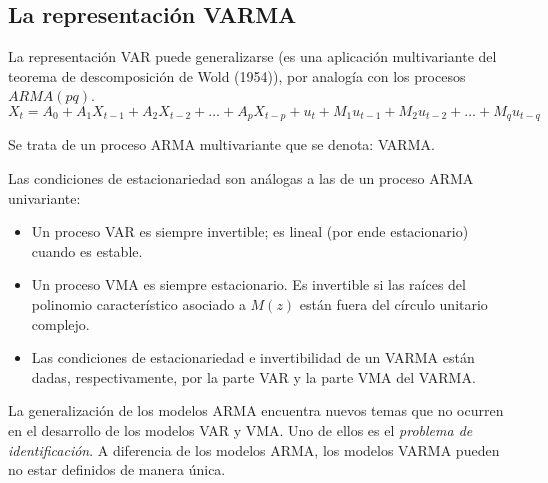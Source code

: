\subsection{La representaci\'{o}n VARMA}
\label{subsubsec:mylabel8}

La representaci\'{o}n VAR puede generalizarse (es una aplicaci\'{o}n multivariante del teorema de descomposici\'{o}n de Wold (1954)), por analog\'{i}a con los procesos $ARMA(pq)$.
\[
X_{t}=A_{0}+A_{1}X_{t-1}+A_{2}X_{t-2}+\ldots +A_{p}X_{t-p}+u_{t}+M_{1}u_{t-1}+M_{2}u_{t-2}+\ldots +M_{q}u_{t-q}
\]

Se trata de un proceso ARMA multivariante que se denota: VARMA.\newline

Las condiciones de estacionariedad son an\'{a}logas a las de un proceso ARMA univariante: 
\begin{itemize}
      \item Un proceso VAR es siempre invertible; es lineal (por ende estacionario) cuando es estable.
      \item Un proceso VMA es siempre estacionario. Es invertible si las ra\'{i}ces del polinomio caracter\'{i}stico asociado a $M(z)$ est\'{a}n fuera del c\'{i}rculo unitario complejo.
      \item Las condiciones de estacionariedad e invertibilidad de un VARMA est\'{a}n dadas, respectivamente, por la parte VAR y la parte VMA del VARMA.
\end{itemize}

La generalizaci\'{o}n de los modelos ARMA encuentra nuevos temas que no ocurren en el desarrollo de los modelos VAR y VMA. Uno de ellos es el \textit{problema de identificaci\'{o}n}. A diferencia de los modelos ARMA, los modelos VARMA pueden no estar  definidos de manera \'{u}nica.

